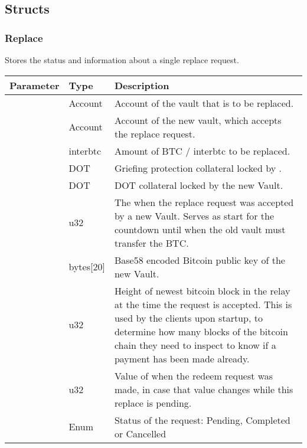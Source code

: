 \documentclass[a4paper,10pt,english]{sphinxmanual}
\begin{document}
\subsection{Structs}
\label{\detokenize{spec/replace:structs}}

\subsubsection{Replace}
\label{\detokenize{spec/replace:id3}}
Stores the status and information about a single replace request.


\begin{savenotes}\sphinxattablestart
\centering
\begin{tabulary}{\linewidth}[t]{|l|l|L|}
\hline
\sphinxstyletheadfamily 
Parameter
&\sphinxstyletheadfamily 
Type
&\sphinxstyletheadfamily 
Description
\\
\hline
{}
&
Account
&
Account of the vault that is to be replaced.
\\
\hline
{}
&
Account
&
Account of the new vault, which accepts the replace request.
\\
\hline
{}
&
interbtc
&
Amount of BTC / interbtc to be replaced.
\\
\hline
{}
&
DOT
&
Griefing protection collateral locked by .
\\
\hline
{}
&
DOT
&
DOT collateral locked by the new Vault.
\\
\hline
{}
&
u32
&
The {\hyperref[\detokenize{spec/security:activeblockcount}]{}} when the replace request was accepted by a new Vault. Serves as start for the countdown until when the old vault must transfer the BTC.
\\
\hline
{}
&
bytes{[}20{]}
&
Base58 encoded Bitcoin public key of the new Vault.
\\
\hline
{}
&
u32
&
Height of newest bitcoin block in the relay at the time the request is accepted. This is used by the clients upon startup, to determine how many blocks of the bitcoin chain they need to inspect to know if a payment has been made already.
\\
\hline
{}
&
u32
&
Value of {\hyperref[\detokenize{spec/replace:replaceperiod}]{}} when the redeem request was made, in case that value changes while this replace is pending.
\\
\hline
{}
&
Enum
&
Status of the request: Pending, Completed or Cancelled
\\
\hline
\end{tabulary}
\par
\sphinxattableend\end{savenotes}
\end{document}
